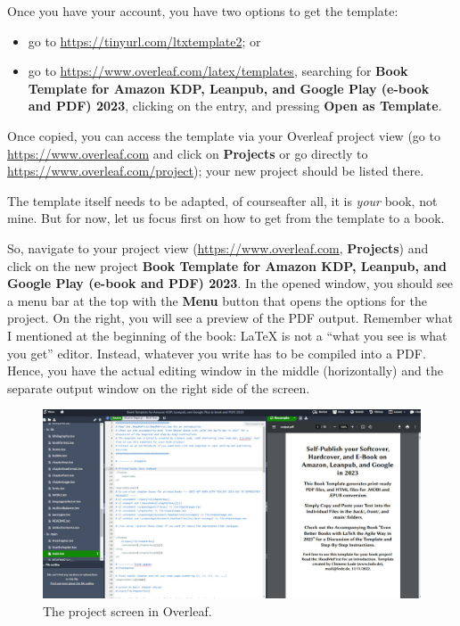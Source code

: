 Once you have your account, you have two options to get the template:

\begin{itemize}
\item go to \url{https://tinyurl.com/ltxtemplate2}; or 
\item go to \url{https://www.overleaf.com/latex/templates}, searching for \textbf{Book Template for Amazon KDP, Leanpub, and Google Play (e-book and PDF) 2023}, clicking on the entry, and pressing \textbf{Open as Template}.
\end{itemize}

Once copied, you can access the template via your Overleaf project view (go to \url{https://www.overleaf.com} and click on \textbf{Projects} or go directly to \url{https://www.overleaf.com/project}); your new project should be listed there. 

The template itself needs to be adapted, of course\emdash{}after all, it is \emph{your} book, not mine. But for now, let us focus first on how to get from the template to a book. 

So, navigate to your project view (\url{https://www.overleaf.com}, \textbf{Projects}) and click on the new project \textbf{Book Template for Amazon KDP, Leanpub, and Google Play (e-book and PDF) 2023}. In the opened window, you should see a menu bar at the top with the \textbf{Menu} button that opens the options for the project. On the right, you will see a preview of the PDF output. Remember what I mentioned at the beginning of the book: LaTeX is not a ``what you see is what you get'' editor. Instead, whatever you write has to be compiled into a PDF. Hence, you have the actual editing window in the middle (horizontally) and the separate output window on the right side of the screen.

\begin{figure}[H]\centering
\includegraphics[width=\textwidth]{images/overleaf.jpg}
\caption{The project screen in Overleaf.}
\label{overleaf:fig}
\end{figure}




